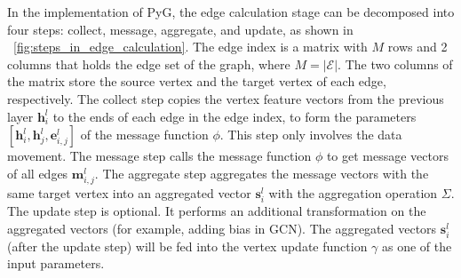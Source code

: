 In the implementation of PyG, the edge calculation stage can be decomposed into four steps: collect, message, aggregate, and update, as shown in \figurename~\ref{fig:steps_in_edge_calculation}.
The edge index is a matrix with $M$ rows and 2 columns that holds the edge set of the graph, where $M=|\mathcal{E}|$.
The two columns of the matrix store the source vertex and the target vertex of each edge, respectively.
The collect step copies the vertex feature vectors from the previous layer $\boldsymbol{h}_i^l$ to the ends of each edge
in the edge index, to form the parameters $[\boldsymbol{h}^l_i, \boldsymbol{h}^l_{j}, \boldsymbol{e}^l_{i,j}]$ of the message function $\phi$.
This step only involves the data movement.
The message step calls the message function $\phi$ to get message vectors of all edges $\boldsymbol{m}_{i, j}^l$.
The aggregate step aggregates the message vectors with the same target vertex into an aggregated vector $\boldsymbol{s}^l_i$ with the aggregation operation $\Sigma$.
The update step is optional.
It performs an additional transformation on the aggregated vectors (for example, adding bias in GCN).
The aggregated vectors $\boldsymbol{s}^l_i$ (after the update step) will be fed into the vertex update function $\gamma$ as one of the input parameters.

